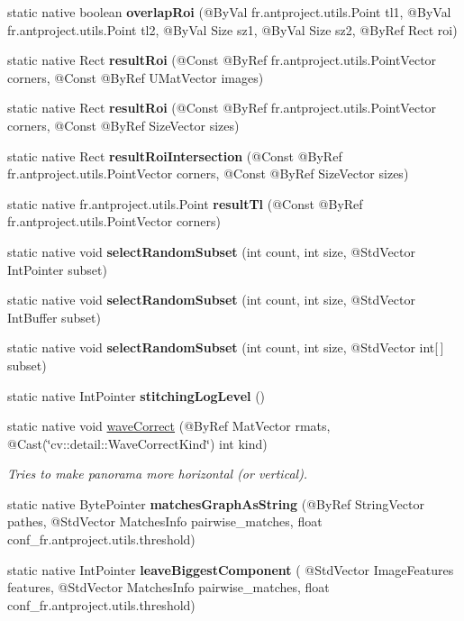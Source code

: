 \begin{DoxyCompactItemize}
\item 
static native boolean {\bfseries overlap\+Roi} (@By\+Val fr.antproject.utils.Point tl1, @By\+Val fr.antproject.utils.Point tl2, @By\+Val Size sz1, @By\+Val Size sz2, @By\+Ref Rect roi)
\item 
static native Rect {\bfseries result\+Roi} (@Const @By\+Ref fr.antproject.utils.Point\+Vector corners, @Const @By\+Ref U\+Mat\+Vector images)
\item 
static native Rect {\bfseries result\+Roi} (@Const @By\+Ref fr.antproject.utils.Point\+Vector corners, @Const @By\+Ref Size\+Vector sizes)
\item 
static native Rect {\bfseries result\+Roi\+Intersection} (@Const @By\+Ref fr.antproject.utils.Point\+Vector corners, @Const @By\+Ref Size\+Vector sizes)
\item 
static native fr.antproject.utils.Point {\bfseries result\+Tl} (@Const @By\+Ref fr.antproject.utils.Point\+Vector corners)
\item 
static native void {\bfseries select\+Random\+Subset} (int count, int size, @Std\+Vector Int\+Pointer subset)
\item 
static native void {\bfseries select\+Random\+Subset} (int count, int size, @Std\+Vector Int\+Buffer subset)
\item 
static native void {\bfseries select\+Random\+Subset} (int count, int size, @Std\+Vector int\mbox{[}$\,$\mbox{]} subset)
\item 
static native Int\+Pointer {\bfseries stitching\+Log\+Level} ()
\item 
static native void \hyperlink{group__stitching__rotation_ga3bba1a4cfe47a38f2ef140a3bc6c0f0a}{wave\+Correct} (@By\+Ref Mat\+Vector rmats, @Cast(\char`\"{}cv\+::detail\+::\+Wave\+Correct\+Kind\char`\"{}) int kind)
\begin{DoxyCompactList}\small\item\em Tries to make panorama more horizontal (or vertical). \end{DoxyCompactList}\item 
static native Byte\+Pointer {\bfseries matches\+Graph\+As\+String} (@By\+Ref String\+Vector pathes, @Std\+Vector Matches\+Info pairwise\+\_\+matches, float conf\+\_\+fr.antproject.utils.threshold)
\item 
static native Int\+Pointer {\bfseries leave\+Biggest\+Component} ( @Std\+Vector Image\+Features features, @Std\+Vector Matches\+Info pairwise\+\_\+matches, float conf\+\_\+fr.antproject.utils.threshold)

\end{DoxyCompactItemize}
